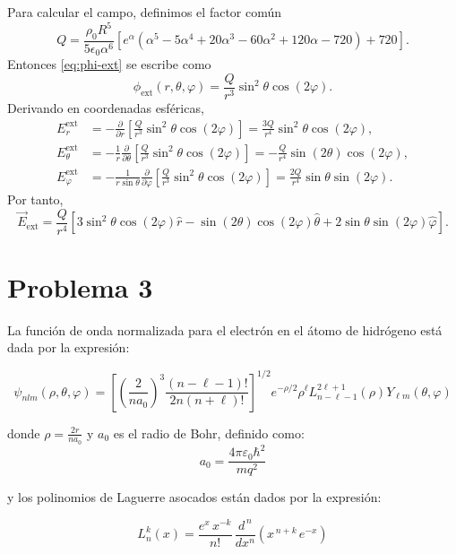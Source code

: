 \documentclass[a4paper]{article}
\begin{document}
\begin{enumerate}[a)]
Para calcular el campo, definimos el factor común
\begin{equation}
\label{eq:q-ext}
Q=\frac{\rho_0R^5}{5\epsilon_0\alpha^6}
\left[e^\alpha(\alpha^5-5\alpha^4+20\alpha^3-60\alpha^2+120\alpha-720)+720\right].
\end{equation}
Entonces \eqref{eq:phi-ext} se escribe como
\[
\phi_{\mathrm{ext}}(r,\theta,\varphi)=\frac{Q}{r^3}\sin^2\theta\cos(2\varphi).
\]
Derivando en coordenadas esféricas,
\begin{align*}
E_r^{\mathrm{ext}}
&=-\frac{\partial}{\partial r}\left[\frac{Q}{r^3}\sin^2\theta\cos(2\varphi)\right]
=\frac{3Q}{r^4}\sin^2\theta\cos(2\varphi),\\
E_\theta^{\mathrm{ext}}
&=-\frac{1}{r}\frac{\partial}{\partial\theta}\left[\frac{Q}{r^3}\sin^2\theta\cos(2\varphi)\right]
=-\frac{Q}{r^4}\sin(2\theta)\cos(2\varphi),\\
E_\varphi^{\mathrm{ext}}
&=-\frac{1}{r\sin\theta}\frac{\partial}{\partial\varphi}\left[\frac{Q}{r^3}\sin^2\theta\cos(2\varphi)\right]
=\frac{2Q}{r^4}\sin\theta\sin(2\varphi).
\end{align*}
Por tanto,
\begin{equation}
\label{eq:e-ext}
\boxed{
\vec E_{\mathrm{ext}}
=\frac{Q}{r^4}\left[3\sin^2\theta\cos(2\varphi)\hat r
-\sin(2\theta)\cos(2\varphi)\hat\theta
+2\sin\theta\sin(2\varphi)\hat\varphi\right].}
\end{equation}

\end{enumerate}

\section{Problema 3}

La función de onda normalizada para el electrón en el átomo de hidrógeno está dada por la expresión:

$$
\psi_{nlm}(\rho, \theta, \varphi) = \left[ \left(\frac{2}{na_0}\right)^3 \frac{(n-\ell-1)!}{2n(n+\ell)!} \right]^{1/2} e^{-\rho/2} \rho^\ell L_{n-\ell-1}^{2\ell+1}(\rho) Y_{\ell m}(\theta, \varphi)
$$

donde $\rho = \frac{2r}{na_0}$ y $a_0$ es el radio de Bohr, definido como:
$$
a_0 = \frac{4\pi\varepsilon_0 \hbar^2}{m q^2}
$$

y los polinomios de Laguerre asocados están dados por la expresión:

$$ L_n^{k}(x)=\frac{e^{x}\,x^{-k}}{n!}\,\frac{d^{\,n}}{dx^{n}}\left(x^{\,n+k}\,e^{-x}\right)$$
\end{document}
